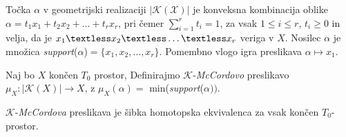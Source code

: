 Točka $\alpha$ v geometrijski realizaciji $|\mathcal{K(X)}|$ je
konveksna kombinacija oblike
$\alpha = t_1x_1+t_2x_2 + \ldots + t_r x_r$, pri čemer 
$\sum_{i=1}^{r}t_i=1$, za vsak $1 \le i \le r$, $t_i \ge 0$ in 
velja, da je $x_1 \textless x_2 \textless \ldots \textless x_r$ veriga v $X$.
 Nosilec $\alpha$ je množica \textit{support}($\alpha$)$= \{x_1,x_2,\ldots,x_r\}$. Pomembno vlogo igra 
 preslikava $\alpha \mapsto x_1$.
 
 \begin{definicija}
    Naj bo $X$ končen $T_0$ prostor, Definirajmo
    $\mathcal{K}$-\textit{McCordovo} preslikavo $\mu_X:|\mathcal{K}
    (X)|\rightarrow X$, z $\mu_X(\alpha) =$
    min(\textit{support}($\alpha))$.
\end{definicija}

\begin{izrek}
    $\mathcal{K}$-\textit{McCordova} preslikava je šibka homotopska 
    ekvivalenca za vsak končen $T_0$-prostor.
\end{izrek}